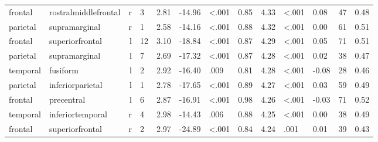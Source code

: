 \documentclass{article}
\begin{document}
\begin{longtable}{llrR{1.3cm}R{1cm}R{1.3cm}R{1cm}R{1cm}R{1.3cm}R{1cm}R{1.8cm}R{1.3cm}R{1.8cm}}
   frontal &      rostralmiddlefrontal &    r &         3 &                  2.81 &           -14.96 &      \textless.001 &                               0.85 &                          4.33 &                   \textless.001 &   0.08 &     47 &      0.48 \\
  parietal &             supramarginal &    r &         1 &                  2.58 &           -14.16 &      \textless.001 &                               0.88 &                          4.32 &                   \textless.001 &   0.00 &     61 &      0.51 \\
   frontal &           superiorfrontal &    l &        12 &                  3.10 &           -18.84 &      \textless.001 &                               0.87 &                          4.29 &                   \textless.001 &   0.05 &     71 &      0.51 \\
  parietal &             supramarginal &    l &         7 &                  2.69 &           -17.32 &      \textless.001 &                               0.87 &                          4.28 &                   \textless.001 &   0.02 &     38 &      0.47 \\
  temporal &                  fusiform &    l &         2 &                  2.92 &           -16.40 &               .009 &                               0.81 &                          4.28 &                   \textless.001 &  -0.08 &     28 &      0.46 \\
  parietal &          inferiorparietal &    l &         1 &                  2.78 &           -17.65 &      \textless.001 &                               0.89 &                          4.27 &                   \textless.001 &   0.03 &     59 &      0.49 \\
   frontal &                precentral &    l &         6 &                  2.87 &           -16.91 &      \textless.001 &                               0.98 &                          4.26 &                   \textless.001 &  -0.03 &     71 &      0.52 \\
  temporal &          inferiortemporal &    r &         4 &                  2.98 &           -14.43 &               .006 &                               0.88 &                          4.25 &                   \textless.001 &   0.00 &     38 &      0.49 \\
   frontal &           superiorfrontal &    r &         2 &                  2.97 &           -24.89 &      \textless.001 &                               0.84 &                          4.24 &                            .001 &   0.01 &     39 &      0.43 \\

\end{longtable}
\end{document}
